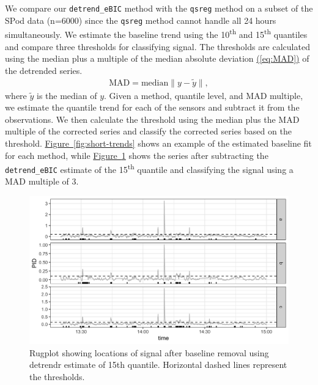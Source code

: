 \documentclass[12pt]{article}
\newcommand{\Eqn}[1]{\hyperref[eq:#1]{{\rm (\ref*{eq:#1})}}} %
\newcommand{\Fig}[1]{\hyperref[fig:#1]{Figure~\ref*{fig:#1}}} %
\newcommand{\Eqn}[1]{{(\ref{eq:#1})}} %
\newcommand{\Fig}[1]{{Figure~\ref{fig:#1}}} %
\begin{document}
	We compare our \texttt{detrend\_eBIC} method with the \texttt{qsreg} method on a subset of the SPod data (n=6000) since the \texttt{qsreg} method cannot handle all 24 hours simultaneously. We estimate the baseline trend using the 10\textsuperscript{th} and 15\textsuperscript{th} quantiles and compare three thresholds for classifying signal. The thresholds are calculated using the median plus a multiple of the median absolute deviation \Eqn{MAD} of the detrended series. 
	\begin{eqnarray}
	\label{eq:MAD}
	\mbox{MAD} = \mbox{median}\lVert y-\tilde{y}\rVert,
	\end{eqnarray}
	where $\tilde{y}$ is the median of $y$. Given a method, quantile level, and MAD multiple, we estimate the quantile trend for each of the sensors and subtract it from the observations. We then calculate the threshold using the median plus the MAD multiple of the corrected series and classify the corrected series based on the threshold. \Fig{short-trends} shows an example of the estimated baseline fit for each method, while \Fig{rugplot} shows the series after subtracting the \texttt{detrend\_eBIC} estimate of the 15\textsuperscript{th} quantile and classifying the signal using a MAD multiple of 3. 
	 
 	\begin{figure}
	 	\includegraphics[width = \linewidth]{Figures/corrected_rugplot.png}
	 	\caption{Rugplot showing locations of signal after baseline removal using detrendr estimate of 15th quantile. Horizontal dashed lines represent the thresholds.}
	 	\label{fig:rugplot}
	 \end{figure}
	 
\end{document}
